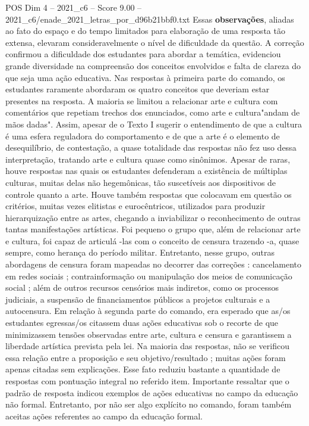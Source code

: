 \begin{textsample}{POS Dim 4 – 2021\_c6 – Score 9.00 – 2021\_c6/enade\_2021\_letras\_por\_d96b21bbf0.txt}
Essas \textbf{observações}, aliadas ao fato do espaço e do tempo limitados para elaboração de uma resposta tão extensa, elevaram consideravelmente o nível de dificuldade da questão.
A correção confirmou a dificuldade dos estudantes para abordar a temática, evidenciou grande diversidade na compreensão dos conceitos envolvidos e falta de clareza do que seja uma ação educativa.
Nas respostas à primeira parte do comando, os estudantes raramente abordaram os quatro conceitos que deveriam estar presentes na resposta.
A maioria se limitou a relacionar arte e cultura com comentários que repetiam trechos dos enunciados, como arte e cultura"andam de mãos dadas".
Assim, apesar de o Texto I sugerir o entendimento de que a cultura é uma esfera reguladora do comportamento e de que a arte é o elemento de desequilíbrio, de contestação, a quase totalidade das respostas não fez uso dessa interpretação, tratando arte e cultura quase como sinônimos.
Apesar de raras, houve respostas nas quais os estudantes defenderam a existência de múltiplas culturas, muitas delas não hegemônicas, tão suscetíveis aos dispositivos de controle quanto a arte.
Houve também respostas que colocavam em questão os critérios, muitas vezes elitistas e eurocêntricos, utilizados para produzir hierarquização entre as artes, chegando a inviabilizar o reconhecimento de outras tantas manifestações artísticas.
Foi pequeno o grupo que, além de relacionar arte e cultura, foi capaz de articulá -las com o conceito de censura trazendo -a, quase sempre, como herança do período militar.
Entretanto, nesse grupo, outras abordagens de censura foram mapeadas no decorrer das correções : cancelamento em redes sociais ; contrainformação ou manipulação dos meios de comunicação social ; além de outros recursos censórios mais indiretos, como os processos judiciais, a suspensão de financiamentos públicos a projetos culturais e a autocensura.
Em relação à segunda parte do comando, era esperado que as/os estudantes egressas/os citassem duas ações educativas sob o recorte de que minimizassem tensões observadas entre arte, cultura e censura e garantissem a liberdade artística prevista pela lei.
Na maioria das respostas, não se verificou essa relação entre a proposição e seu objetivo/resultado ; muitas ações foram apenas citadas sem explicações.
Esse fato reduziu bastante a quantidade de respostas com pontuação integral no referido item.
Importante ressaltar que o padrão de resposta indicou exemplos de ações educativas no campo da educação não formal.
Entretanto, por não ser algo explícito no comando, foram também aceitas ações referentes ao campo da educação formal.

\end{textsample}
